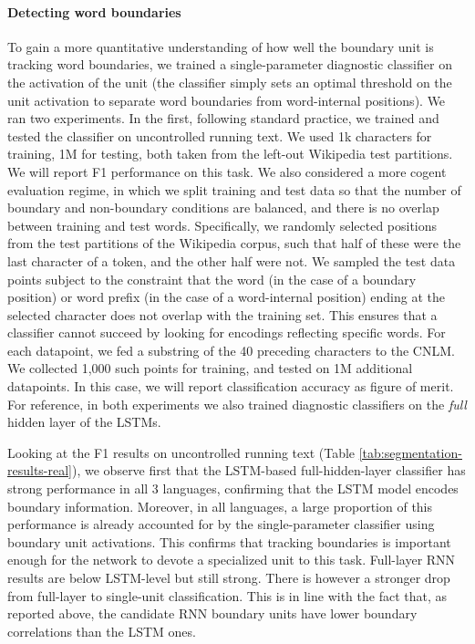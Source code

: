 \paragraph{Detecting word boundaries} To gain a more quantitative
understanding of how well the boundary unit is tracking word
boundaries, we trained a single-parameter diagnostic classifier on the
activation of the unit (the classifier simply sets an optimal
threshold on the unit activation to separate word boundaries from
word-internal positions). We ran two experiments. In the first,
following standard practice, we trained and tested the classifier on
uncontrolled running text. We used 1k characters for training, 1M for
testing, both taken from the left-out Wikipedia test partitions. We
will report F1 performance on this task. We also considered a more cogent
evaluation regime, in which we split training and test data so that
the number of boundary and non-boundary conditions are balanced, and
there is no overlap between training and test words. Specifically, we
randomly selected positions from the test partitions of the Wikipedia
corpus, such that half of these were the last character of a token,
and the other half were not.  %
We sampled the test data points subject to the constraint that the
word (in the case of a boundary position) or word prefix (in the case
of a word-internal position) ending at the selected character does not
overlap with the training set. This ensures that a classifier cannot
succeed by looking for encodings reflecting specific words.  For each
datapoint, we fed a substring of the 40 preceding characters to the
CNLM. %
We collected 1,000 such points for training, and tested on 1M additional datapoints. In this
case, we will report classification accuracy as figure of merit.
For reference, in both experiments we also trained diagnostic
classifiers on the \emph{full} hidden layer of the LSTMs.

Looking at the F1 results on uncontrolled running text (Table
\ref{tab:segmentation-results-real}), we observe first that the
LSTM-based full-hidden-layer classifier has strong performance in all
3 languages, confirming that the LSTM model encodes boundary
information.  Moreover, in all languages, a large proportion of this
performance is already accounted for by the single-parameter
classifier using boundary unit activations. This confirms that
tracking boundaries is important enough for the network to devote a
specialized unit to this task. Full-layer RNN results are below
LSTM-level but still strong. There is however a
stronger drop from full-layer to single-unit classification. This is in
line with the fact that, as reported above, the candidate RNN boundary units have lower
boundary correlations than the LSTM ones.

